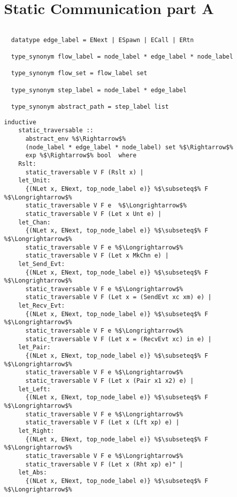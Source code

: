 \documentclass{article}
\begin{document}
\section{Static Communication part A}
\begin{lstlisting}[style=codestyle1, escapechar=\%]

  datatype edge_label = ENext | ESpawn | ECall | ERtn

  type_synonym flow_label = node_label * edge_label * node_label

  type_synonym flow_set = flow_label set

  type_synonym step_label = node_label * edge_label

  type_synonym abstract_path = step_label list
  \end{lstlisting}

\begin{lstlisting}[style=codestyle1, escapechar=\%]
  inductive
    static_traversable ::
      abstract_env %$\Rightarrow$%
      (node_label * edge_label * node_label) set %$\Rightarrow$%
      exp %$\Rightarrow$% bool  where
    Rslt:
      static_traversable V F (Rslt x) |
    let_Unit:
      {(NLet x, ENext, top_node_label e)} %$\subseteq$% F %$\Longrightarrow$%
      static_traversable V F e  %$\Longrightarrow$%
      static_traversable V F (Let x Unt e) |
    let_Chan:
      {(NLet x, ENext, top_node_label e)} %$\subseteq$% F %$\Longrightarrow$%
      static_traversable V F e %$\Longrightarrow$%
      static_traversable V F (Let x MkChn e) |
    let_Send_Evt:
      {(NLet x, ENext, top_node_label e)} %$\subseteq$% F %$\Longrightarrow$%
      static_traversable V F e %$\Longrightarrow$%
      static_traversable V F (Let x = (SendEvt xc xm) e) |
    let_Recv_Evt:
      {(NLet x, ENext, top_node_label e)} %$\subseteq$% F %$\Longrightarrow$%
      static_traversable V F e %$\Longrightarrow$%
      static_traversable V F (Let x = (RecvEvt xc) in e) |
    let_Pair:
      {(NLet x, ENext, top_node_label e)} %$\subseteq$% F %$\Longrightarrow$%
      static_traversable V F e %$\Longrightarrow$%
      static_traversable V F (Let x (Pair x1 x2) e) |
    let_Left:
      {(NLet x, ENext, top_node_label e)} %$\subseteq$% F %$\Longrightarrow$%
      static_traversable V F e %$\Longrightarrow$%
      static_traversable V F (Let x (Lft xp) e) |
    let_Right:
      {(NLet x, ENext, top_node_label e)} %$\subseteq$% F %$\Longrightarrow$%
      static_traversable V F e %$\Longrightarrow$%
      static_traversable V F (Let x (Rht xp) e)" |
    let_Abs:
      {(NLet x, ENext, top_node_label e)} %$\subseteq$% F %$\Longrightarrow$%

\end{lstlisting}
\end{document}

